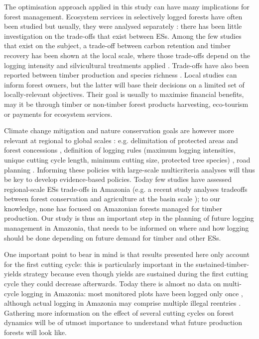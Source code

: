 \documentclass{article}
\begin{document}
The optimisation approach applied in this study can have many implications for forest management. Ecosystem services in selectively logged forests have often been studied but usually, they were analysed separately \cite{Putz2012}: there has been little investigation on the trade-offs that exist between ESs. Among the few studies that exist on the subject, a trade-off between carbon retention and timber recovery has been shown at the local scale, where those trade-offs depend on the logging intensity and silvicultural treatments applied \cite{Roopsind2018}. Trade-offs have also been reported between timber production and species richness \cite{Burivalova2014}.  
Local studies can inform forest owners, but the latter will base their decisions on a limited set of locally-relevant objectives. Their goal is usually to maximise financial benefits, may it be through timber or non-timber forest products harvesting, eco-tourism or payments for ecosystem services. 

Climate change mitigation and nature conservation goals are however more relevant at regional to global scales \cite{Hein2006b}: e.g. delimitation of protected areas and forest concessions \cite{Verissimo2002}, definition of logging rules (maximum logging intensities, unique cutting cycle length, minimum cutting size, protected tree species) \cite{Blaser2011}, road planning \cite{Laurance2014}. Informing these policies with large-scale multicriteria analyses will thus be key to develop evidence-based policies. Today few studies have assessed regional-scale ESs trade-offs in Amazonia (e.g. a recent study analyses tradeoffs between forest conservation and agriculture at the basin scale \cite{OConnell2018}); to our knowledge, none has focused on Amazonian forests managed for timber production. Our study is thus an important step in the planning of future logging management in Amazonia, that needs to be informed on where and how logging should be done depending on future demand for timber and other ESs. 

One important point to bear in mind is that results presented here only account for the first cutting cycle: this is particularly important in the sustained-timber-yields strategy because even though yields are sustained during the first cutting cycle they could decrease afterwards. Today there is almost no data on multi-cycle logging in Amazonia: most monitored plots have been logged only once \cite{Sist2015}, although actual logging in Amazonia may comprise multiple illegal reentries \cite{Tritsch2016a}. Gathering more information on the effect of several cutting cycles on forest dynamics will be of utmost importance to understand what future production forests will look like. 
\end{document}
